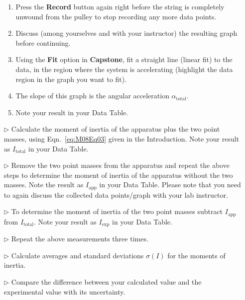 \begin{itemize}
\begin{enumerate}
  \item Press the \textbf{Record} button again right before the string is completely unwound from the pulley to stop recording any more data points.
  \item Discuss (among yourselves and with your instructor) the resulting graph before continuing.
  \item Using the \textbf{Fit} option in \textbf{Capstone}, fit a straight line (linear fit) to the data, in the region where the system is accelerating (highlight the data region in the graph you want to fit).
  \item The slope of this graph is the angular acceleration $\alpha_{\mbox{total}}$.
  \item Note your result in your Data Table.
  \end{enumerate}
\item[$\triangleright$] Calculate the moment of inertia of the apparatus plus the two point masses, using Eqn.~\ref{eq:M08Eq03} given in the Introduction. Note your result as $I_{\mbox{total}}$ in your Data Table.
\item[$\triangleright$] Remove the two point masses from the apparatus and repeat the above steps to determine the moment of inertia of the apparatus without the two masses. Note the result as $I_{\mbox{app}}$ in your Data Table. Please note that you need to again discuss the collected data points/graph with your lab instructor.
\item[$\triangleright$] To determine the moment of inertia of the two point masses subtract $I_{\mbox{app}}$ from $I_{\mbox{total}}$. Note your result as $I_{\mbox{exp}}$ in your Data Table.
\item[$\triangleright$] Repeat the above measurements three times.
\item[$\triangleright$] Calculate averages and standard deviations $\sigma(I)$ for the moments of inertia.%
\item[$\triangleright$] Compare the difference between your calculated value and the experimental value with its uncertainty.
\end{itemize}


\pagebreak

